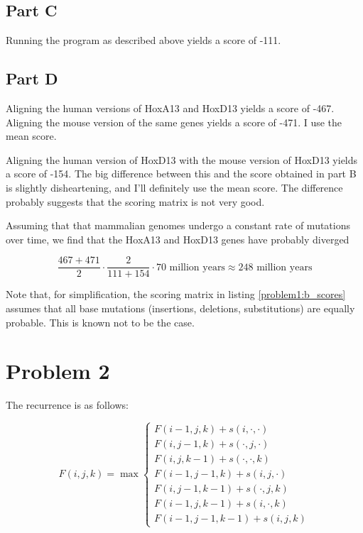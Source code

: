 

\subsection{Part C}
Running the program as described above yields a score of -111.

\subsection{Part D}
Aligning the human versions of HoxA13 and HoxD13 yields a score of -467.
Aligning the mouse version of the same genes yields a score of -471. I use the
mean score.

Aligning the human version of HoxD13 with the mouse version of HoxD13 yields a
score of -154. The big difference between this and the score obtained in part B
is slightly disheartening, and I'll definitely use the mean score. The
difference probably suggests that the scoring matrix is not very good.

Assuming that that mammalian genomes undergo a constant rate of mutations over
time, we find that the HoxA13 and HoxD13 genes have probably diverged

$$
\frac{467 + 471}{2} \cdot \frac{2}{111 + 154} \cdot {70 \textrm{ million years}}
\approx 248 \textrm{ million years}
$$

Note that, for simplification, the scoring matrix in listing
\ref{problem1:b_scores} assumes that all base mutations (insertions, deletions,
substitutions) are equally probable. This is known not to be the case.


\section{Problem 2}

The recurrence is as follows:

$$
F(i, j, k) = \max \left\{
\begin{array}{l}
F(i - 1, j, k) + s(i, \cdot, \cdot) \\
F(i, j - 1, k) + s(\cdot, j, \cdot) \\
F(i, j, k - 1) + s(\cdot, \cdot, k) \\
F(i - 1, j - 1, k) + s(i, j, \cdot) \\
F(i, j - 1, k - 1) + s(\cdot, j, k) \\
F(i - 1, j, k - 1) + s(i, \cdot, k) \\
F(i - 1, j - 1, k - 1) + s(i, j, k)
\end{array}
\right.
$$

